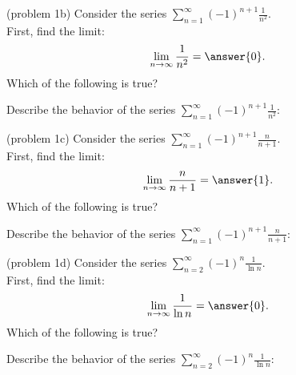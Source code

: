 \documentclass{ximera}
\begin{document}
\begin{problem}(problem 1b)
Consider the series $\displaystyle{\sum_{n=1}^\infty (-1)^{n+1} \frac{1}{n^2}}$.\\
First, find the limit:
\[
\lim_{n\to\infty} \frac{1}{n^2} = \answer{0}.
\]
Which of the following is true?
\begin{multipleChoice}
\end{multipleChoice}


Describe the behavior of the series $\displaystyle{\sum_{n=1}^\infty (-1)^{n+1} \frac{1}{n^2}:}$
\begin{multipleChoice}
\end{multipleChoice}

\end{problem}



\begin{problem}(problem 1c)
Consider the series $\displaystyle{\sum_{n=1}^\infty (-1)^{n+1} \frac{n}{n+1}}$.\\
First, find the limit:
\[
\lim_{n\to\infty} \frac{n}{n+1} = \answer{1}.
\]
Which of the following is true?
\begin{multipleChoice}
\end{multipleChoice}


Describe the behavior of the series $\displaystyle{\sum_{n=1}^\infty (-1)^{n+1} \frac{n}{n+1}:}$
\begin{multipleChoice}
\end{multipleChoice}

\end{problem}


\begin{problem}(problem 1d)
Consider the series $\displaystyle{\sum_{n=2}^\infty (-1)^n \frac{1}{\ln n}}$.\\
First, find the limit:
\[
\lim_{n\to\infty} \frac{1}{\ln n} = \answer{0}.
\]
Which of the following is true?
\begin{multipleChoice}
\end{multipleChoice}


Describe the behavior of the series $\displaystyle{\sum_{n=2}^\infty (-1)^n \frac{1}{\ln n}:}$
\begin{multipleChoice}
\end{multipleChoice}

\end{problem}
\end{document}
